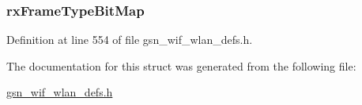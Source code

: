 \hypertarget{a00306_ac0490e36a56543f4ec855ae0c4aa9ea6}{
\subsubsection[{rxFrameTypeBitMap}]{ {\bf rxFrameTypeBitMap}}}
\label{a00306_ac0490e36a56543f4ec855ae0c4aa9ea6}


Definition at line 554 of file gsn\_\-wif\_\-wlan\_\-defs.h.



The documentation for this struct was generated from the following file:\begin{DoxyCompactItemize}
\item 
\hyperlink{a00613}{gsn\_\-wif\_\-wlan\_\-defs.h}\end{DoxyCompactItemize}
